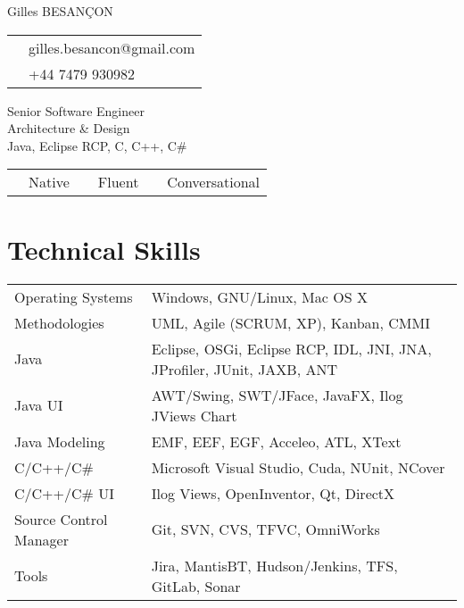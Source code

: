 \documentclass[10pt,letterpaper]{resume/resume}
\begin{document}
  \begin{minipage}[t]{\linewidth * 1 / 3}
    {\Large Gilles BESAN\c{C}ON}\\
      \begin{tabular}{c l}
         \email{&gilles.besancon@gmail.com}\\
         \phone{&+44 7479 930982}\\
      \end{tabular}
  \end{minipage}
  \begin{minipage}[t]{\linewidth * 2 / 3}
    \begin{center}
      {\huge{Senior Software Engineer\\Architecture \& Design\\Java, Eclipse RCP, C, C++, C\#}}
      \begin{tabular}{c l c l c l}
      \french{French:&Native}&\englishus{English:&Fluent}&\spanish{Spanish:&Conversational}\\
      \end{tabular}
    \end{center}
  \end{minipage}
  
  \begin{minipage}[t]{\linewidth}
    \section{Technical Skills}
    \begin{tabular}{ll}
	Operating Systems&Windows, GNU/Linux, Mac OS X\\
	Methodologies&UML, Agile (SCRUM, XP), Kanban, CMMI\\
	Java&Eclipse, OSGi, Eclipse RCP, IDL, JNI, JNA, JProfiler, JUnit, JAXB, ANT\\
	Java UI&AWT/Swing, SWT/JFace, JavaFX, Ilog JViews Chart\\
	Java Modeling&EMF, EEF, EGF, Acceleo, ATL, XText\\
	C/C++/C\#&Microsoft Visual Studio, Cuda, NUnit, NCover\\
	C/C++/C\# UI&Ilog Views, OpenInventor, Qt, DirectX\\
	Source Control Manager&Git, SVN, CVS, TFVC, OmniWorks\\
	Tools&Jira, MantisBT, Hudson/Jenkins, TFS, GitLab, Sonar\\
    \end{tabular}
  \end{minipage}
  
\end{document}

